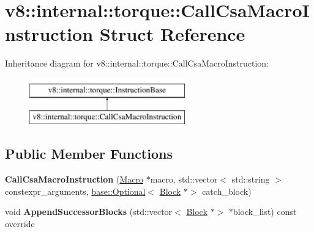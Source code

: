 \hypertarget{structv8_1_1internal_1_1torque_1_1CallCsaMacroInstruction}{}\section{v8\+:\+:internal\+:\+:torque\+:\+:Call\+Csa\+Macro\+Instruction Struct Reference}
\label{structv8_1_1internal_1_1torque_1_1CallCsaMacroInstruction}
Inheritance diagram for v8\+:\+:internal\+:\+:torque\+:\+:Call\+Csa\+Macro\+Instruction\+:\begin{figure}[H]
\begin{center}
\leavevmode
\includegraphics[height=2.000000cm]{structv8_1_1internal_1_1torque_1_1CallCsaMacroInstruction}
\end{center}
\end{figure}
\subsection*{Public Member Functions}
\begin{DoxyCompactItemize}
\item 
\mbox{\label{structv8_1_1internal_1_1torque_1_1CallCsaMacroInstruction_ad14745f0ed12732841e7876d329b816a}} 
{\bfseries Call\+Csa\+Macro\+Instruction} (\mbox{\hyperlink{classv8_1_1internal_1_1torque_1_1Macro}{Macro}} $\ast$macro, std\+::vector$<$ std\+::string $>$ constexpr\+\_\+arguments, \mbox{\hyperlink{classv8_1_1base_1_1Optional}{base\+::\+Optional}}$<$ \mbox{\hyperlink{classv8_1_1internal_1_1torque_1_1Block}{Block}} $\ast$$>$ catch\+\_\+block)
\item 
\mbox{\label{structv8_1_1internal_1_1torque_1_1CallCsaMacroInstruction_af18ca1f14cf71bafeed7261d1029a02f}} 
void {\bfseries Append\+Successor\+Blocks} (std\+::vector$<$ \mbox{\hyperlink{classv8_1_1internal_1_1torque_1_1Block}{Block}} $\ast$$>$ $\ast$block\+\_\+list) const override
\end{DoxyCompactItemize}
